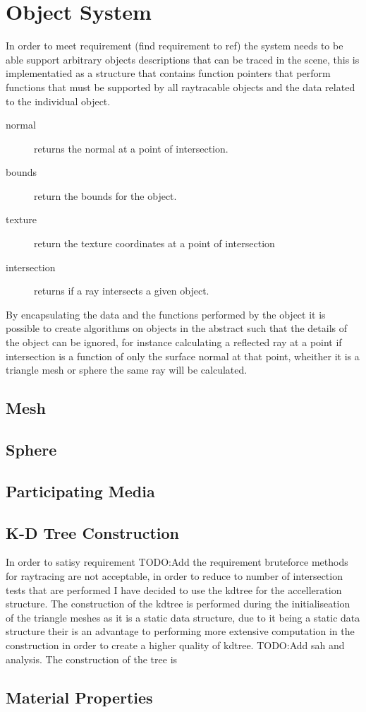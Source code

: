 \section{Object System}
In order to meet requirement \todo(find requirement to ref) the system needs to be able support arbitrary objects descriptions
that can be traced in the scene, this is implementatied as a structure that contains function pointers that perform functions
that must be supported by all raytracable objects and the data related to the individual object.

\begin{description}
\item[normal] returns the normal at a point of intersection.
\item[bounds] return the bounds for the object.
\item[texture] return the texture coordinates at a point of intersection
\item[intersection] returns if a ray intersects a given object.
\end{description}

By encapsulating the data and the functions performed by the object it is possible to create algorithms on objects in the
abstract such that the details of the object can be ignored, for instance calculating a reflected ray at a point if intersection
is a function of only the surface normal at that point, wheither it is a triangle mesh or sphere the same ray will be calculated.

\subsection{Mesh}
\subsection{Sphere}

\subsection{Participating Media}

\subsection{K-D Tree Construction}
In order to satisy requirement TODO:Add the requirement bruteforce methods for raytracing are not acceptable, in order to reduce
to number of intersection tests that are performed I have decided to use the kdtree for the accelleration structure. The
construction of the kdtree is performed during the initialiseation of the triangle meshes as it is a static data structure, due
to it being a static data structure their is an advantage to performing more extensive computation in the construction in
order to create a higher quality of kdtree. TODO:Add sah and analysis. The construction of the tree is 

\subsection{Material Properties}
